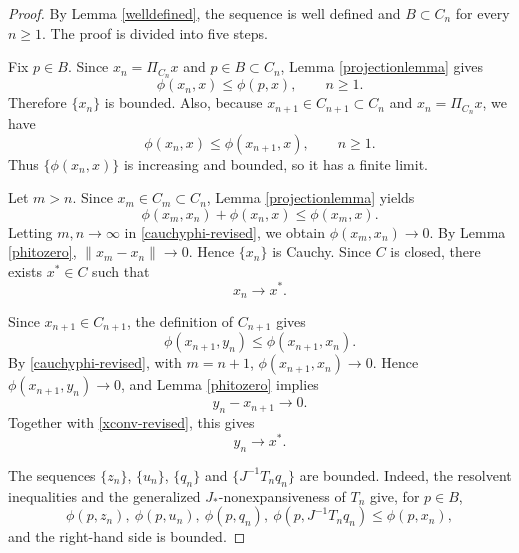 \documentclass[10pt,a4paper]{amsart}
\numberwithin{equation}{section}
\begin{document}
\begin{proof}
By Lemma \ref{welldefined}, the sequence is well defined and $B\subset C_n$ for every $n\geq1$. The proof is divided into five steps.

Fix $p\in B$. Since $x_n=\Pi_{C_n}x$ and $p\in B\subset C_n$, Lemma \ref{projectionlemma} gives
\[
\phi(x_n,x)\leq \phi(p,x),\qquad n\geq1.
\]
Therefore $\{x_n\}$ is bounded. Also, because $x_{n+1}\in C_{n+1}\subset C_n$ and $x_n=\Pi_{C_n}x$, we have
\[
\phi(x_n,x)\leq \phi(x_{n+1},x),\qquad n\geq1.
\]
Thus $\{\phi(x_n,x)\}$ is increasing and bounded, so it has a finite limit.

Let $m>n$. Since $x_m\in C_m\subset C_n$, Lemma \ref{projectionlemma} yields
\begin{equation}\label{cauchyphi-revised}
\phi(x_m,x_n)+\phi(x_n,x)\leq \phi(x_m,x).
\end{equation}
Letting $m,n\to\infty$ in \eqref{cauchyphi-revised}, we obtain $\phi(x_m,x_n)\to0$. By Lemma \ref{phitozero}, $\|x_m-x_n\|\to0$. Hence $\{x_n\}$ is Cauchy. Since $C$ is closed, there exists $x^{*}\in C$ such that
\begin{equation}\label{xconv-revised}
x_n\to x^{*}.
\end{equation}

Since $x_{n+1}\in C_{n+1}$, the definition of $C_{n+1}$ gives
\[
\phi(x_{n+1},y_n)\leq \phi(x_{n+1},x_n).
\]
By \eqref{cauchyphi-revised}, with $m=n+1$, $\phi(x_{n+1},x_n)\to0$. Hence $\phi(x_{n+1},y_n)\to0$, and Lemma \ref{phitozero} implies
\begin{equation}\label{ynconv-revised}
y_n-x_{n+1}\to0.
\end{equation}
Together with \eqref{xconv-revised}, this gives
\begin{equation}\label{ynx-revised}
y_n\to x^{*}.
\end{equation}

The sequences $\{z_n\}$, $\{u_n\}$, $\{q_n\}$ and $\{J^{-1}T_nq_n\}$ are bounded. Indeed, the resolvent inequalities and the generalized $J_{*}$-nonexpansiveness of $T_n$ give, for $p\in B$,
\[
\phi(p,z_n),\ \phi(p,u_n),\ \phi(p,q_n),\ \phi(p,J^{-1}T_nq_n)\leq \phi(p,x_n),
\]
and the right-hand side is bounded.


\end{proof}
\end{document}
